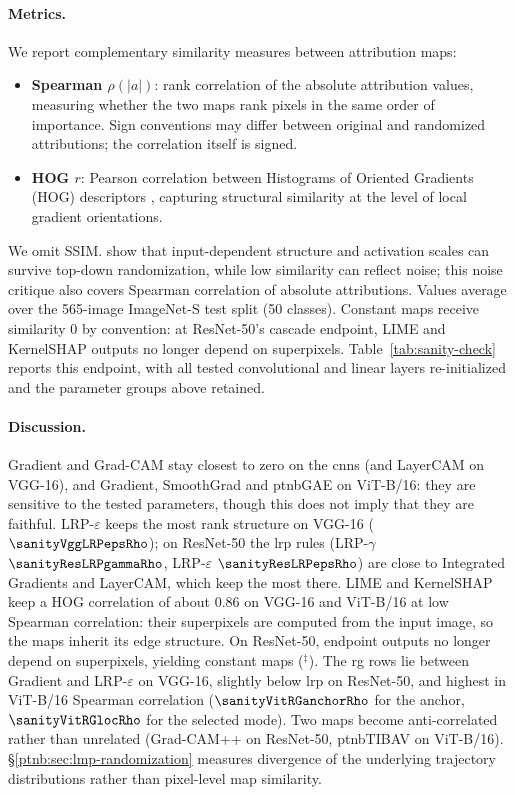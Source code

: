 \paragraph{Metrics.}
We report complementary similarity measures between attribution maps:
\begin{itemize}
    \item \textbf{Spearman $\rho(|a|)$}: rank correlation of the absolute attribution values, measuring whether the two maps rank pixels in the same order of importance. Sign conventions may differ between original and randomized attributions; the correlation itself is signed.
    \item \textbf{HOG $r$}: Pearson correlation between Histograms of Oriented Gradients (HOG) descriptors \parencite{Dalal2005hog}, capturing structural similarity at the level of local gradient orientations.
\end{itemize}
We omit SSIM. \textcite{Binder2022shortcomings} show that input-dependent structure and activation scales can survive top-down randomization, while low similarity can reflect noise; this noise critique also covers Spearman correlation of absolute attributions. Values average over the 565-image ImageNet-S test split (50 classes). Constant maps receive similarity $0$ by convention: at ResNet-50's cascade endpoint, LIME and KernelSHAP outputs no longer depend on superpixels. Table~\ref{tab:sanity-check} reports this endpoint, with all tested convolutional and linear layers re-initialized and the parameter groups above retained.

\paragraph{Discussion.}
Gradient and Grad-CAM stay closest to zero on the \acp{cnn} (and LayerCAM on VGG-16), and Gradient, SmoothGrad and \ac{ptnbGAE} on ViT-B/16: they are sensitive to the tested parameters, though this does not imply that they are faithful. LRP-$\varepsilon$ keeps the most rank structure on VGG-16 ($\sanityVggLRPepsRho$); on ResNet-50 the \ac{lrp} rules (LRP-$\gamma$ $\sanityResLRPgammaRho$, LRP-$\varepsilon$ $\sanityResLRPepsRho$) are close to Integrated Gradients and LayerCAM, which keep the most there. LIME and KernelSHAP keep a HOG correlation of about $0.86$ on VGG-16 and ViT-B/16 at low Spearman correlation: their superpixels are computed from the input image, so the maps inherit its edge structure. On ResNet-50, endpoint outputs no longer depend on superpixels, yielding constant maps ($^{\ddagger}$). The \ac{rg} rows lie between Gradient and LRP-$\varepsilon$ on VGG-16, slightly below \ac{lrp} on ResNet-50, and highest in ViT-B/16 Spearman correlation ($\sanityVitRGanchorRho$ for the anchor, $\sanityVitRGlocRho$ for the selected mode). Two maps become anti-correlated rather than unrelated (Grad-CAM++ on ResNet-50, \ac{ptnbTIBAV} on ViT-B/16). \S\ref{ptnb:sec:lmp-randomization} measures divergence of the underlying trajectory distributions rather than pixel-level map similarity.

